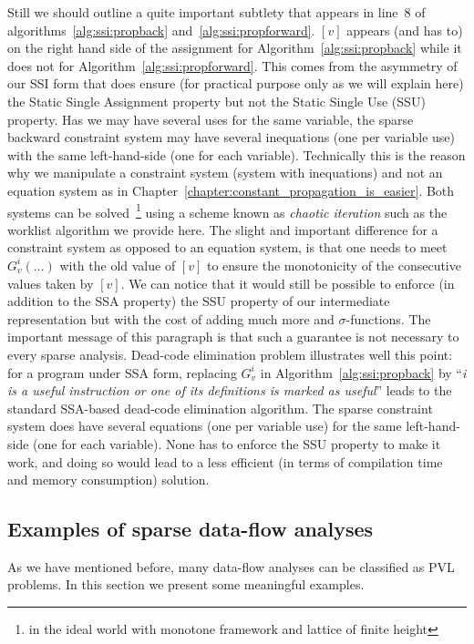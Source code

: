 Still we should outline a quite important subtlety that appears in line~8 of algorithms~\ref{alg:ssi:propback} and~\ref{alg:ssi:propforward}. $[v]$ appears (and has to) on the right hand side of the assignment for Algorithm~\ref{alg:ssi:propback} while it does not for Algorithm~\ref{alg:ssi:propforward}. This comes from the asymmetry of our SSI form that does ensure (for practical purpose only as we will explain here) the Static Single Assignment property but not the Static Single Use (SSU) property. Has we may have several uses for the same variable, the sparse backward constraint system may have several inequations (one per variable use) with the same left-hand-side  (one for each variable). Technically this is the reason why we manipulate a constraint system (system with inequations) and not an equation system as in Chapter~\ref{chapter:constant_propagation_is_easier}. Both systems can be solved~\footnote{in the ideal world with monotone framework and lattice of finite height} using a scheme known as \emph{chaotic iteration} such as the worklist algorithm we provide here. The slight and important difference for a constraint system as opposed to an equation system, is that one needs to meet $G_v^i(\dots)$ with the old value of $[v]$ to ensure the monotonicity of the consecutive values taken by $[v]$.
We can notice that it would still be possible to enforce (in addition to the SSA property) the SSU property of our intermediate representation but with the cost of adding much more \phiops and $\sigma$-functions.
The important message of this paragraph is that such a guarantee is not necessary to every sparse analysis.
Dead-code elimination problem illustrates well this point:
for a program under SSA form, replacing $G_v^i$ in Algorithm~\ref{alg:ssi:propback} by ``\emph{i is a useful instruction or one of its definitions is marked as useful}'' leads to the standard SSA-based dead-code elimination algorithm.
The sparse constraint system does have several equations (one per variable use) for the same left-hand-side (one for each variable).
None has to enforce the SSU property to make it work, and doing so would lead to a less efficient (in terms of compilation time and memory consumption) solution.


\subsection{Examples of sparse data-flow analyses}
\label{sub:ssi:examples}

As we have mentioned before, many data-flow analyses can be classified as PVL problems.
In this section we present some meaningful examples.


